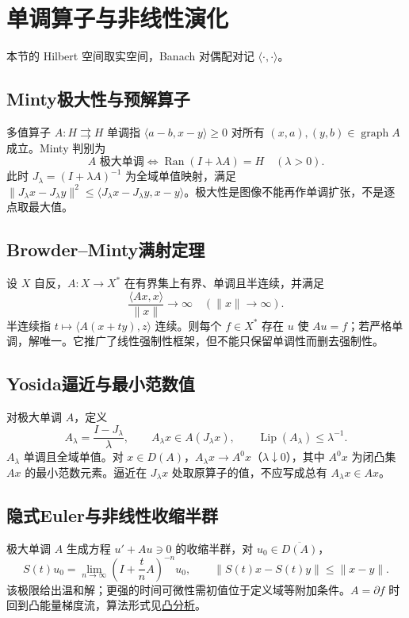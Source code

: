 \documentclass[../main.tex]{subfiles}
\begin{document}
\section{单调算子与非线性演化}\label{sec:fa-monotone}
本节的 Hilbert 空间取实空间，Banach 对偶配对记 $\langle\cdot,\cdot\rangle$。
\subsection{Minty极大性与预解算子}
多值算子 $A:H\rightrightarrows H$ 单调指 $\langle a-b,x-y\rangle\ge0$ 对所有 $(x,a),(y,b)\in\operatorname{graph}A$ 成立。Minty 判别为
\[
A\text{ 极大单调}\iff\operatorname{Ran}(I+\lambda A)=H\quad(\lambda>0).
\]
此时 $J_\lambda=(I+\lambda A)^{-1}$ 为全域单值映射，满足 $\|J_\lambda x-J_\lambda y\|^2\le\langle J_\lambda x-J_\lambda y,x-y\rangle$。极大性是图像不能再作单调扩张，不是逐点取最大值。
\subsection{Browder--Minty满射定理}
设 $X$ 自反，$A:X\to X^*$ 在有界集上有界、单调且半连续，并满足
\[
\frac{\langle Ax,x\rangle}{\|x\|}\longrightarrow\infty\quad(\|x\|\to\infty).
\]
半连续指 $t\mapsto\langle A(x+ty),z\rangle$ 连续。则每个 $f\in X^*$ 存在 $u$ 使 $Au=f$；若严格单调，解唯一。它推广了线性强制性框架，但不能只保留单调性而删去强制性。
\subsection{Yosida逼近与最小范数值}
对极大单调 $A$，定义
\[
A_\lambda=\frac{I-J_\lambda}\lambda,\qquad
A_\lambda x\in A(J_\lambda x),\qquad\operatorname{Lip}(A_\lambda)\le\lambda^{-1}.
\]
$A_\lambda$ 单调且全域单值。对 $x\in D(A)$，$A_\lambda x\to A^0x$（$\lambda\downarrow0$），其中 $A^0x$ 为闭凸集 $Ax$ 的最小范数元素。逼近在 $J_\lambda x$ 处取原算子的值，不应写成总有 $A_\lambda x\in Ax$。
\subsection{隐式Euler与非线性收缩半群}
极大单调 $A$ 生成方程 $u'+Au\ni0$ 的收缩半群，对 $u_0\in\overline{D(A)}$，
\[
S(t)u_0=\lim_{n\to\infty}\left(I+\frac tnA\right)^{-n}u_0,\qquad
\|S(t)x-S(t)y\|\le\|x-y\|.
\]
该极限给出温和解；更强的时间可微性需初值位于定义域等附加条件。$A=\partial f$ 时回到凸能量梯度流，算法形式见\hyperref[chap:convex-analysis]{凸分析}。
\end{document}
